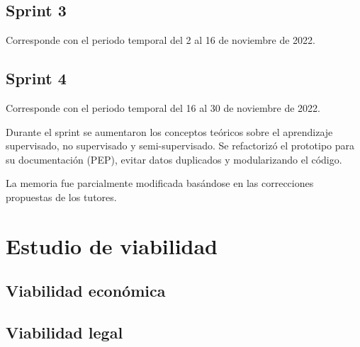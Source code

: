 \subsection{Sprint 3}

Corresponde con el periodo temporal del 2 al 16 de noviembre de 2022.

\subsection{Sprint 4}

Corresponde con el periodo temporal del 16 al 30 de noviembre de 2022.

Durante el sprint se aumentaron los conceptos teóricos sobre el aprendizaje
supervisado, no supervisado y semi-supervisado. Se refactorizó el prototipo para
su documentación (PEP), evitar datos duplicados y modularizando el código.

La memoria fue parcialmente modificada basándose en las correcciones propuestas
de los tutores.



\section{Estudio de viabilidad}

\subsection{Viabilidad económica}

\subsection{Viabilidad legal}


